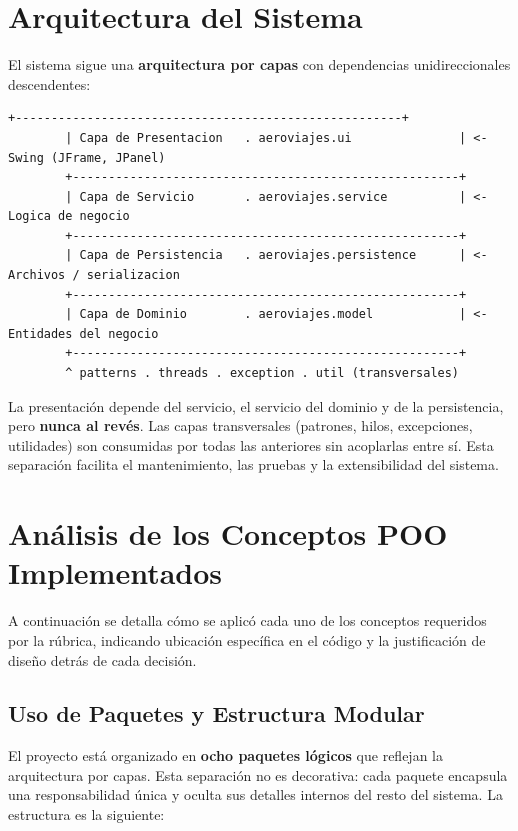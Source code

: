 \documentclass[12pt, letterpaper]{article}
\begin{document}
	\section{Arquitectura del Sistema}
	El sistema sigue una \textbf{arquitectura por capas} con dependencias unidireccionales descendentes:
	
	\begin{lstlisting}[basicstyle=\ttfamily\footnotesize, backgroundcolor=\color{backcolour}, numbers=none]
		+------------------------------------------------------+
		| Capa de Presentacion   . aeroviajes.ui               | <- Swing (JFrame, JPanel)
		+------------------------------------------------------+
		| Capa de Servicio       . aeroviajes.service          | <- Logica de negocio
		+------------------------------------------------------+
		| Capa de Persistencia   . aeroviajes.persistence      | <- Archivos / serializacion
		+------------------------------------------------------+
		| Capa de Dominio        . aeroviajes.model            | <- Entidades del negocio
		+------------------------------------------------------+
		^ patterns . threads . exception . util (transversales)
	\end{lstlisting}
	
	La presentación depende del servicio, el servicio del dominio y de la persistencia, pero \textbf{nunca al revés}. Las capas transversales (patrones, hilos, excepciones, utilidades) son consumidas por todas las anteriores sin acoplarlas entre sí. Esta separación facilita el mantenimiento, las pruebas y la extensibilidad del sistema.
	
	\section{Análisis de los Conceptos POO Implementados}
	A continuación se detalla cómo se aplicó cada uno de los conceptos requeridos por la rúbrica, indicando ubicación específica en el código y la justificación de diseño detrás de cada decisión.
	
	\subsection{Uso de Paquetes y Estructura Modular}
	El proyecto está organizado en \textbf{ocho paquetes lógicos} que reflejan la arquitectura por capas. Esta separación no es decorativa: cada paquete encapsula una responsabilidad única y oculta sus detalles internos del resto del sistema. La estructura es la siguiente:
	
\end{document}
